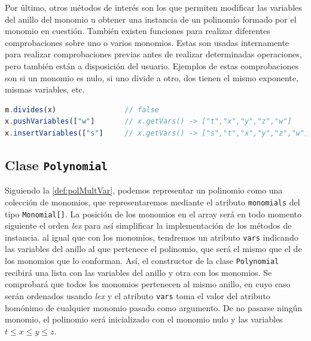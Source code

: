 Por último, otros métodos de interés son los que permiten modificar las variables del anillo del monomio u obtener una instancia de un polinomio formado por el monomio en cuestión. También existen funciones para realizar diferentes comprobaciones sobre uno o varios monomios. Estas son usadas internamente para realizar comprobaciones previas antes de realizar determinadas operaciones, pero también están a disposición del usuario. Ejemplos de estas comprobaciones son si un monomio es nulo, si uno divide a otro, dos tienen el mismo exponente, mismas variables, etc.
\begin{lstlisting}[language=Javascript]
m.divides(x)                // false
x.pushVariables(["w"]       // x.getVars() -> ["t","x","y","z","w"]
x.insertVariables(["s"]     // x.getVars() -> ["s","t","x","y","z","w"]
\end{lstlisting}
\subsection{Clase \texttt{Polynomial}}
Siguiendo la \autoref{def:polMultVar}, podemos representar un polinomio como una colección de monomios, que representaremos mediante el atributo \texttt{monomials} del tipo \texttt{Monomial[]}. La posición de los monomios en el array será en todo momento siguiente el orden \textit{lex} para así simplificar la implementación de los métodos de instancia. al igual que con los monomios, tendremos un atributo \texttt{vars} indicando las variables del anillo al que pertenece el polinomio, que será el mismo que el de los monomios que lo conforman. Así, el constructor de la clase \texttt{Polynomial} recibirá una lista con las variables del anillo y otra con los monomios. Se comprobará que todos los monomios pertenecen al mismo anillo, en cuyo caso serán ordenados usando \textit{lex} y el atributo \texttt{vars} toma el valor del atributo homónimo de cualquier monomio pasado como argumento. De no pasarse ningún monomio, el polinomio será inicializado con el monomio nulo y las variables $t\le x\le y \le z$.\newline

